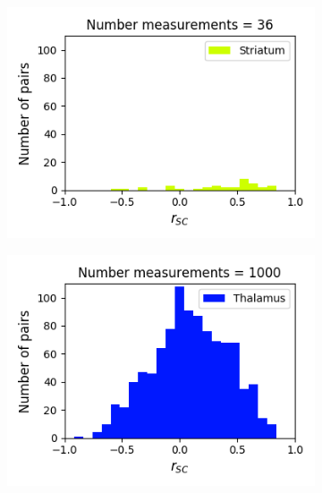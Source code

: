 \documentclass[a4paper,12pt]{article}
\theoremstyle{definition}
\begin{document}
\begin{figure}[p]
\begin{subfigure}{0.5\textwidth}
  \end{subfigure}
  \begin{subfigure}{0.5\textwidth}
    \centering
    \includegraphics[width=\textwidth]{figures/strong_striatum_14_1p0_correlation_histogram.png}
  \end{subfigure}
  \begin{subfigure}{0.5\textwidth}
    \centering
    \includegraphics[width=\textwidth]{figures/strong_thalamus_15_1p0_correlation_histogram.png}
  \end{subfigure}
  \begin{subfigure}{0.5\textwidth}
    \centering

\end{subfigure}
\end{figure}
\end{document}
